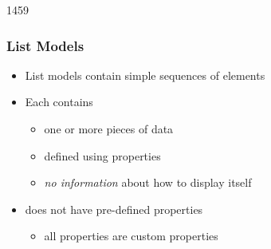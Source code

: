 
\begin{slide}{1459}\frametitle{List Models}

\begin{itemize}
\item List models contain simple sequences of elements
\item Each  contains
  \begin{itemize}
  \item one or more pieces of data
  \item defined using properties
  \item \textit{no information} about how to display itself
  \end{itemize}
\item {} does not have pre-defined properties
  \begin{itemize}
  \item all properties are custom properties
  \end{itemize}
\end{itemize}

\vspace*{1em}
\begin{qml}
\\
\\
\\
\\
\qtt{\}}
\end{qml}

\end{slide}


